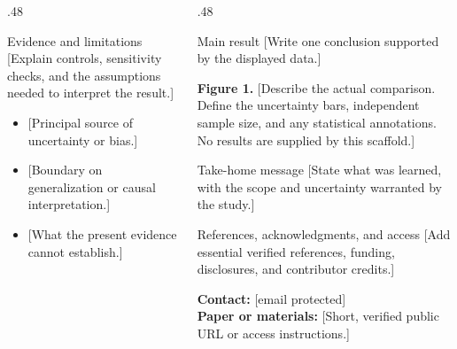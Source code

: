 \documentclass[final]{beamer}
\begin{document}
\begin{frame}[t]
\begin{columns}[t,onlytextwidth]
\begin{column}{.48\textwidth}
\begin{block}{Evidence and limitations}
[Explain controls, sensitivity checks, and the assumptions needed to interpret the result.]
\vspace{0.6cm}
\begin{itemize}
\item {[Principal source of uncertainty or bias.]}
\item {[Boundary on generalization or causal interpretation.]}
\item {[What the present evidence cannot establish.]}
\end{itemize}
\end{block}
\end{column}

\begin{column}{.48\textwidth}
\begin{block}{Main result}
[Write one conclusion supported by the displayed data.]
\vspace{1cm}
\centering
\par
\vspace{0.7cm}
\raggedright
\noindent\textbf{Figure 1.} [Describe the actual comparison. Define the uncertainty bars,
independent sample size, and any statistical annotations. No results are supplied
by this scaffold.]
\end{block}
\vspace{1cm}

\begin{alertblock}{Take-home message}
[State what was learned, with the scope and uncertainty warranted by the study.]
\end{alertblock}
\vspace{1cm}

\begin{block}{References, acknowledgments, and access}
[Add essential verified references, funding, disclosures, and contributor credits.]\par
\vspace{1cm}
\textbf{Contact:} [email protected]\\
\textbf{Paper or materials:} [Short, verified public URL or access instructions.]
\end{block}
\end{column}
\end{columns}
\end{frame}
\end{document}
